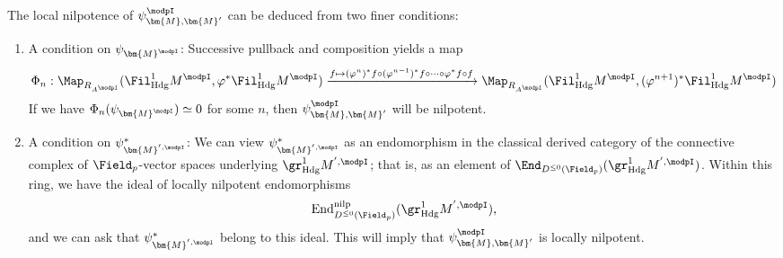 \documentclass[10pt]{amsart}
\begin{document}
\begin{remark}
\label{rem:nilpotence_conditions}
The local nilpotence of $\psi^\modpI_{\bm{M},\bm{M}'}$ can be deduced from two finer conditions:
\begin{enumerate}
   \item A condition on $\psi_{\bm{M}^\modpI}$: Successive pullback and composition yields a map
   \[
     \Phi_n:\Map_{R_{A^\modpI}}(\Fil^1_{\mathrm{Hdg}}M^\modpI,\varphi^*\Fil^1_{\mathrm{Hdg}}M^\modpI)\xrightarrow{f\mapsto (\varphi^n)^*f \circ (\varphi^{n-1})^*f \circ \cdots\circ \varphi^*f \circ f}\Map_{R_{A^\modpI}}(\Fil^1_{\mathrm{Hdg}}M^\modpI,(\varphi^{n+1})^*\Fil^1_{\mathrm{Hdg}}M^\modpI)
   \]
   If we have $\Phi_n(\psi_{\bm{M}^\modpI})\simeq 0$ for some $n$, then $\psi^\modpI_{\bm{M},\bm{M}'}$ will be nilpotent.

   \item A condition on $\psi^*_{\bm{M}^{',\modpI}}$: We can view $\psi^*_{\bm{M}^{',\modpI}}$ as an endomorphism in the classical derived category of the connective complex of $\Field_p$-vector spaces underlying $\gr^1_{\mathrm{Hdg}}M^{',\modpI}$; that is, as an element of $\End_{D^{\leq 0}(\Field_p)}(\gr^1_{\mathrm{Hdg}}M^{',\modpI})$. Within this ring, we have the ideal of locally nilpotent endomorphisms
   \[
   \mathrm{End}^{\mathrm{nilp}}_{D^{\leq 0}(\Field_p)}(\gr^1_{\mathrm{Hdg}}M^{',\modpI}),
   \]
   and we can ask that $\psi^*_{\bm{M}^{',\modpI}}$ belong to this ideal. This will imply that $\psi^\modpI_{\bm{M},\bm{M}'}$ is locally nilpotent.
\end{enumerate}
\end{remark}  
\end{document}
